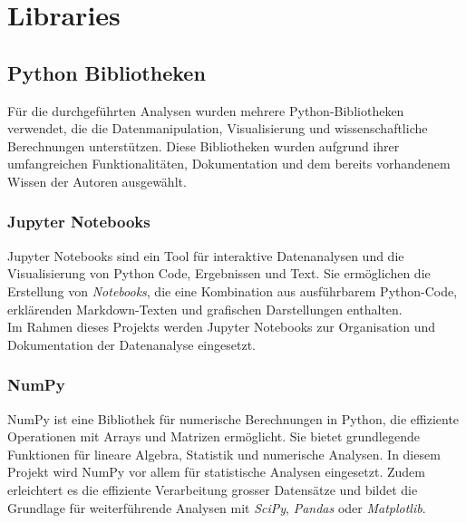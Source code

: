 

\chapter{Libraries} %

\label{AppendixA} %


\section{Python Bibliotheken}
Für die durchgeführten Analysen wurden mehrere Python-Bibliotheken verwendet, die die Datenmanipulation, Visualisierung und wissenschaftliche Berechnungen unterstützen. Diese Bibliotheken wurden aufgrund ihrer umfangreichen Funktionalitäten, Dokumentation und dem bereits vorhandenem Wissen der Autoren ausgewählt. 


\subsection{Jupyter Notebooks}  
Jupyter Notebooks sind ein Tool für interaktive Datenanalysen und die Visualisierung von Python Code, Ergebnissen und Text. Sie ermöglichen die Erstellung von \textit{Notebooks}, die eine Kombination aus ausführbarem Python-Code, erklärenden Markdown-Texten und grafischen Darstellungen enthalten. \parencite{noauthor_project_nodate} \\
Im Rahmen dieses Projekts werden Jupyter Notebooks zur Organisation und Dokumentation der Datenanalyse eingesetzt. 

\subsection{NumPy}
NumPy ist eine Bibliothek für numerische Berechnungen in Python, die effiziente Operationen mit Arrays und Matrizen ermöglicht. Sie bietet grundlegende Funktionen für lineare Algebra, Statistik und numerische Analysen. In diesem Projekt wird NumPy vor allem für statistische Analysen eingesetzt. Zudem erleichtert es die effiziente Verarbeitung grosser Datensätze und bildet die Grundlage für weiterführende Analysen mit \textit{SciPy}, \textit{Pandas} oder \textit{Matplotlib}. \parencite{noauthor_numpy_nodate} \parencite{noauthor_what_nodate}


